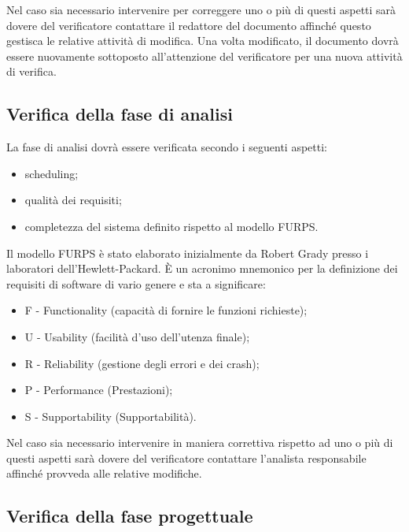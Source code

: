 Nel caso sia necessario intervenire per correggere uno o pi\`u di questi aspetti
sar\`a dovere del verificatore contattare il redattore del documento affinch\'e
questo gestisca le relative attivit\`a di modifica. Una volta modificato, il
documento dovr\`a essere nuovamente sottoposto all'attenzione del verificatore
per una nuova attivit\`a di verifica.


\subsection{Verifica della fase di analisi}

La fase di analisi dovr\`a essere verificata secondo i seguenti aspetti:

\begin{itemize}

\item scheduling;
\item qualit\`a dei requisiti;
\item completezza del sistema definito rispetto al modello FURPS.
 

\end{itemize}

Il modello FURPS \`e stato elaborato inizialmente da Robert Grady presso i
laboratori dell'Hewlett-Packard. \`E un acronimo mnemonico per la definizione dei requisiti
di software di vario genere e sta a significare:

\begin{itemize}

\item F - Functionality (capacit\`a di fornire le funzioni richieste);
\item U - Usability (facilit\`a d'uso dell'utenza finale);
\item R - Reliability (gestione degli errori e dei crash);
\item P - Performance (Prestazioni);
\item S - Supportability (Supportabilit\`a).
\end{itemize}


Nel caso sia necessario intervenire in maniera correttiva rispetto ad uno o
pi\`u di questi aspetti sar\`a dovere del verificatore contattare l'analista
responsabile affinch\'e provveda alle relative modifiche.



\subsection{Verifica della fase progettuale}


